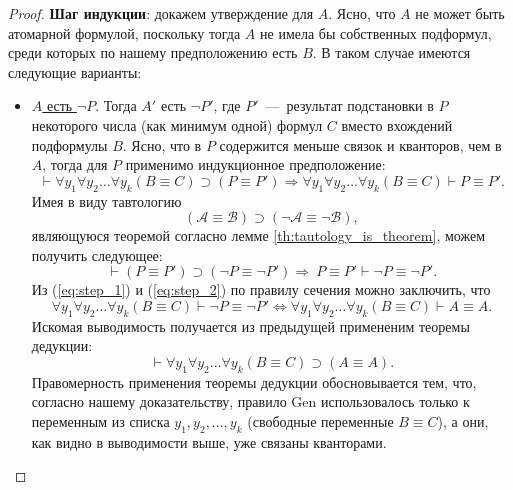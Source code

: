 \begin{proof}
    \textbf{Шаг индукции}: докажем утверждение для $A$. Ясно, что $A$ не может быть атомарной формулой, поскольку тогда $A$ не имела бы собственных подформул, среди которых по нашему предположению есть $B$. В таком случае имеются следующие варианты:
    \begin{itemize}
        \item \underline{$A$ есть $\neg P$}. Тогда $A'$ есть $\neg P'$, где $P'$~---~результат подстановки в $P$ некоторого числа (как минимум одной) формул $C$ вместо вхождений подформулы $B$. Ясно, что в $P$ содержится меньше связок и кванторов, чем в $A$, тогда для $P$ применимо индукционное предположение:
        \begin{equation}\label{eq:step_1}
            \vdash \forall y_1\forall y_2\dots\forall y_k(B \equiv C) \supset (P \equiv P') \Longrightarrow \forall y_1\forall y_2\dots\forall y_k(B \equiv C) \vdash P \equiv P'.
        \end{equation}
        Имея в виду тавтологию
        \[
            (\mathcal{A} \equiv \mathcal{B}) \supset (\neg \mathcal{A} \equiv \neg \mathcal{B}),
        \]
        являющуюся теоремой согласно лемме \ref{th:tautology_is_theorem}, можем получить следующее:
        \begin{equation}\label{eq:step_2}
            \vdash (P \equiv P') \supset (\neg P \equiv \neg P') \Longrightarrow\ P \equiv P' \vdash \neg P \equiv \neg P'.
        \end{equation}
        Из (\ref{eq:step_1}) и (\ref{eq:step_2}) по правилу сечения можно заключить, что
        \[
            \forall y_1\forall y_2\dots\forall y_k(B \equiv C) \vdash \neg P \equiv \neg P' \Longleftrightarrow \forall y_1\forall y_2\dots\forall y_k(B \equiv C) \vdash A \equiv A.
        \]
        Искомая выводимость получается из предыдущей примененим теоремы дедукции:
        \[
            \vdash \forall y_1\forall y_2\dots\forall y_k(B \equiv C) \supset (A \equiv A).
        \]
        Правомерность применения теоремы дедукции обосновывается тем, что, согласно нашему доказательству, правило Gen использовалось только к переменным из списка $y_1, y_2, \dots, y_k$ (свободные переменные $B \equiv C$), а они, как видно в выводимости выше, уже связаны кванторами.


\end{itemize}
\end{proof}
